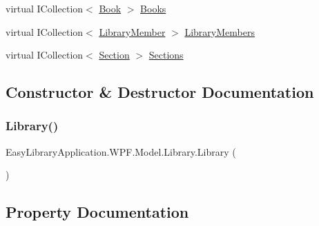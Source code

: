 \begin{DoxyCompactItemize}
virtual I\+Collection$<$ \mbox{\hyperlink{class_easy_library_application_1_1_w_p_f_1_1_model_1_1_book}{Book}} $>$ \mbox{\hyperlink{class_easy_library_application_1_1_w_p_f_1_1_model_1_1_library_a1f295557ea5697b8349eb352538993da}{Books}}
\item 
virtual I\+Collection$<$ \mbox{\hyperlink{class_easy_library_application_1_1_w_p_f_1_1_model_1_1_library_member}{Library\+Member}} $>$ \mbox{\hyperlink{class_easy_library_application_1_1_w_p_f_1_1_model_1_1_library_a65d6a1dbe8d4c1f4a7c22bdf07d5740b}{Library\+Members}}
\item 
virtual I\+Collection$<$ \mbox{\hyperlink{class_easy_library_application_1_1_w_p_f_1_1_model_1_1_section}{Section}} $>$ \mbox{\hyperlink{class_easy_library_application_1_1_w_p_f_1_1_model_1_1_library_a4cc9342c473ab91873d25326877bc676}{Sections}}
\end{DoxyCompactItemize}


\subsection{Constructor \& Destructor Documentation}
\mbox{\label{class_easy_library_application_1_1_w_p_f_1_1_model_1_1_library_a3eb8865f82500e235af26d6831988adf}} 
\subsubsection{\texorpdfstring{Library()}{Library()}}
{\footnotesize\ttfamily Easy\+Library\+Application.\+W\+P\+F.\+Model.\+Library.\+Library (\begin{DoxyParamCaption}{ }\end{DoxyParamCaption})}



\subsection{Property Documentation}
\mbox{\label{class_easy_library_application_1_1_w_p_f_1_1_model_1_1_library_a4b725023c770869121ce418ea5f4949d}} 
